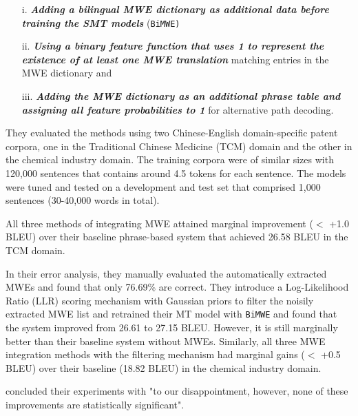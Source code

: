 \begin{itemize}
\item[i.] \emph{\textbf{Adding a bilingual MWE dictionary as additional data before training the SMT models}} ({\tt BiMWE)}
\item[ii.] \emph{\textbf{Using a binary feature function that uses 1 to represent the existence of at least one MWE translation}} matching entries in the MWE dictionary and
\item[iii.] \emph{\textbf{Adding the MWE dictionary as an additional phrase table and assigning all feature probabilities to 1}} for alternative path decoding. 
\end{itemize}

They evaluated the methods using two Chinese-English domain-specific patent corpora, one in the Traditional Chinese Medicine (TCM) domain and the other in the chemical industry domain. The training corpora were of similar sizes with 120,000 sentences that contains around 4.5 tokens for each sentence. The models were tuned and tested on a development and test set that comprised 1,000 sentences (30-40,000 words in total). 

All three methods of integrating MWE attained marginal improvement ($<$ +1.0 BLEU) over their baseline phrase-based system that achieved 26.58 BLEU in the TCM domain. 

In their error analysis, they manually evaluated the automatically extracted MWEs and found that only 76.69\% are correct. They introduce a Log-Likelihood Ratio (LLR) scoring mechanism with Gaussian priors to filter the noisily extracted MWE list and retrained their MT model with {\tt BiMWE} and found that the system improved from 26.61 to 27.15 BLEU. However, it is still marginally better than their baseline system without MWEs. Similarly, all three MWE integration methods with the filtering mechanism had marginal gains ($<$ +0.5 BLEU) over their baseline (18.82 BLEU) in the chemical industry domain.

\cite{ren2009improving} concluded their experiments with "to our disappointment, however, none of these improvements are statistically significant". 

